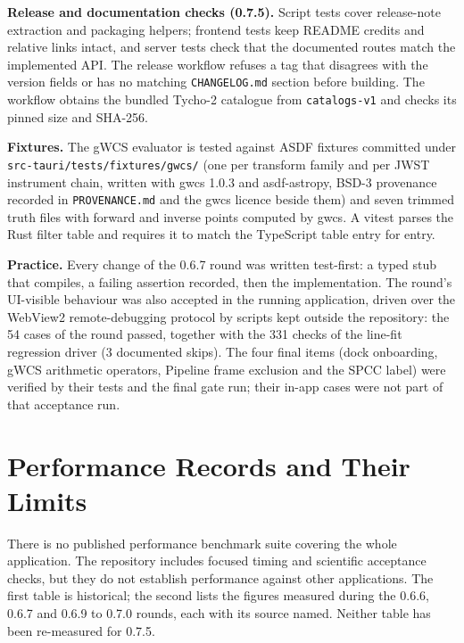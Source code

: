 \documentclass[11pt,a4paper]{article}
\newcommand{\code}[1]{\texttt{\small #1}}
\begin{document}
    \textbf{Release and documentation checks (0.7.5).} Script tests cover release-note extraction and packaging helpers; frontend tests keep README credits and relative links intact, and server tests check that the documented routes match the implemented API. The release workflow refuses a tag that disagrees with the version fields or has no matching \code{CHANGELOG.md} section before building. The workflow obtains the bundled Tycho-2 catalogue from \code{catalogs-v1} and checks its pinned size and SHA-256.

    \textbf{Fixtures.} The gWCS evaluator is tested against ASDF fixtures committed under \code{src-tauri/\allowbreak tests/\allowbreak fixtures/\allowbreak gwcs/} (one per transform family and per JWST instrument chain, written with gwcs 1.0.3 and asdf-astropy, BSD-3 provenance recorded in \code{PROVENANCE.md} and the gwcs licence beside them) and seven trimmed truth files with forward and inverse points computed by gwcs. A vitest parses the Rust filter table and requires it to match the TypeScript table entry for entry.

    \textbf{Practice.} Every change of the 0.6.7 round was written test-first: a typed stub that compiles, a failing assertion recorded, then the implementation. The round's UI-visible behaviour was also accepted in the running application, driven over the WebView2 remote-debugging protocol by scripts kept outside the repository: the 54 cases of the round passed, together with the 331 checks of the line-fit regression driver (3 documented skips). The four final items (dock onboarding, gWCS arithmetic operators, Pipeline frame exclusion and the SPCC label) were verified by their tests and the final gate run; their in-app cases were not part of that acceptance run.

    \section{Performance Records and Their Limits}
    \label{sec:performance}

    There is no published performance benchmark suite covering the whole application. The repository includes focused timing and scientific acceptance checks, but they do not establish performance against other applications. The first table is historical; the second lists the figures measured during the 0.6.6, 0.6.7 and 0.6.9 to 0.7.0 rounds, each with its source named. Neither table has been re-measured for 0.7.5.
\end{document}
